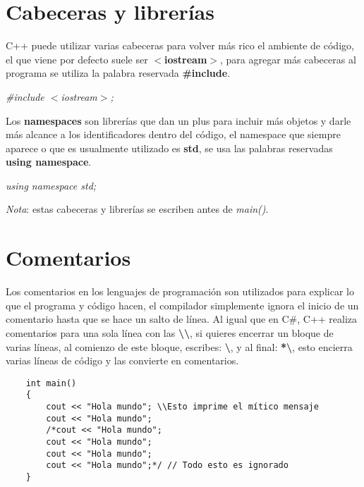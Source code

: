 \section{Cabeceras y librerías}
C++ puede utilizar varias cabeceras para volver más rico el ambiente de código, el que viene por defecto suele ser \textbf{$<$iostream$>$}, para agregar más cabeceras al programa se utiliza la palabra reservada \textbf{\#include}.\begin{center}\textit{\#include $<$iostream$>$;}\end{center}
Los \textbf{namespaces} son librerías que dan un plus para incluir más objetos y darle más alcance a los identificadores dentro del código, el namespace que siempre aparece o que es usualmente utilizado es \textbf{std}, se usa las palabras reservadas \textbf{using namespace}.\begin{center}\textit{using namespace std;}\end{center}
\textit{Nota}: estas cabeceras y librerías se escriben antes de \textit{main()}.



\section{Comentarios}
Los comentarios en los lenguajes de programación son utilizados para explicar lo que el programa y código hacen, el compilador simplemente ignora el inicio de un comentario hasta que se hace un salto de línea. Al igual que en C\#, C++ realiza comentarios para una sola línea con las \textbf{\textbackslash\textbackslash}, si quieres encerrar un bloque de varias líneas, al comienzo de este bloque, escribes: \textbf{\textbackslash*}, y al final: \textbf{*\textbackslash}, esto encierra varias líneas de código y las convierte en comentarios.
\begin{lstlisting}
    int main()
    {
        cout << "Hola mundo"; \\Esto imprime el mítico mensaje
        cout << "Hola mundo";
        /*cout << "Hola mundo";
        cout << "Hola mundo";
        cout << "Hola mundo";
        cout << "Hola mundo";*/ // Todo esto es ignorado
    }
\end{lstlisting}



